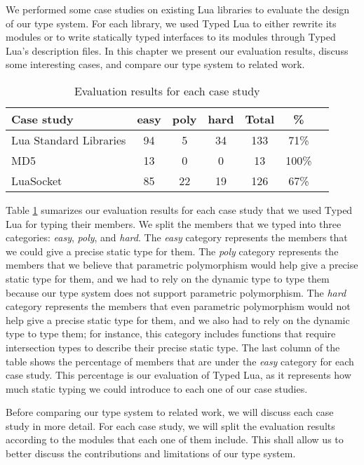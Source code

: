 
We performed some case studies on existing Lua libraries
to evaluate the design of our type system.
For each library, we used Typed Lua to either rewrite its modules
or to write statically typed interfaces to its modules through
Typed Lua's description files.
In this chapter we present our evaluation results, discuss
some interesting cases, and compare our type system to
related work.

\begin{table}[!ht]
\begin{center}
\begin{tabular}{|l|c|c|c|c|c|c|}
\hline
\textbf{Case study} & \textbf{easy} & \textbf{poly} & \textbf{hard} & \textbf{Total} & \textbf{\%} \\
\hline
Lua Standard Libraries & 94 & 5 & 34 & 133 & 71\% \\
\hline
MD5 & 13 & 0 & 0 & 13 & 100\% \\
\hline
LuaSocket & 85 & 22 & 19 & 126 & 67\% \\
\hline
\end{tabular}
\end{center}
\caption{Evaluation results for each case study}
\label{tab:evalbycase}
\end{table}

Table \ref{tab:evalbycase} sumarizes our evaluation results for each
case study that we used Typed Lua for typing their members.
We split the members that we typed into three categories:
\emph{easy}, \emph{poly}, and \emph{hard}.
The \emph{easy} category represents the members that we could give
a precise static type for them.
The \emph{poly} category represents the members that we believe that
parametric polymorphism would help give a precise static type for them,
and we had to rely on the dynamic type to type them because our
type system does not support parametric polymorphism.
The \emph{hard} category represents the members that even parametric
polymorphism would not help give a precise static type for them,
and we also had to rely on the dynamic type to type them;
for instance, this category includes functions that require
intersection types to describe their precise static type.
The last column of the table shows the percentage of members that
are under the \emph{easy} category for each case study.
This percentage is our evaluation of Typed Lua, as it
represents how much static typing we could introduce to each one of
our case studies.

Before comparing our type system to related work, we will discuss
each case study in more detail.
For each case study, we will split the evaluation results according
to the modules that each one of them include.
This shall allow us to better discuss the contributions and limitations
of our type system.

